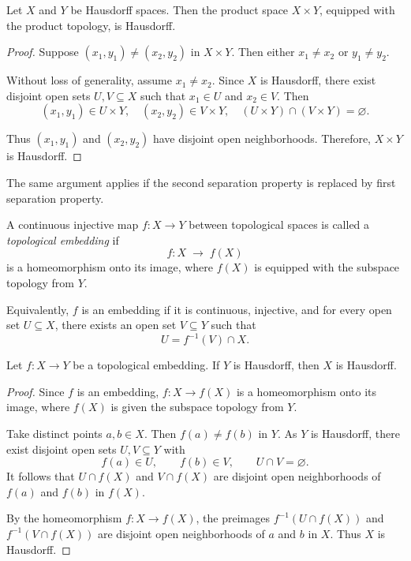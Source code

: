 \begin{proposition} \label{prop:product_Hausdorff}
Let \(X\) and \(Y\) be Hausdorff spaces. Then the product space \(X \times Y\), equipped with the product topology, is Hausdorff.
\end{proposition}

\begin{proof}
Suppose \((x_{1},y_{1}) \neq (x_{2},y_{2})\) in \(X \times Y\). Then either \(x_{1} \neq x_{2}\) or \(y_{1} \neq y_{2}\).

Without loss of generality, assume \(x_{1} \neq x_{2}\). Since \(X\) is Hausdorff, there exist disjoint open sets \(U,V \subseteq X\) such that \(x_{1} \in U\) and \(x_{2} \in V\). Then
\[
(x_{1},y_{1}) \in U \times Y, 
\quad (x_{2},y_{2}) \in V \times Y,
\quad (U \times Y) \cap (V \times Y) = \varnothing.
\]

Thus \((x_{1},y_{1})\) and \((x_{2},y_{2})\) have disjoint open neighborhoods. Therefore, \(X \times Y\) is Hausdorff.
\end{proof}

The same argument applies if the second separation property is replaced by first separation property.

\begin{definition} \label{def:embedding}
A continuous injective map \(f : X \to Y\) between topological spaces is called a \emph{topological embedding} if 
\[
f : X \;\longrightarrow\; f(X)
\]
is a homeomorphism onto its image, where \(f(X)\) is equipped with the subspace topology from \(Y\).
\end{definition}

\begin{remark}
Equivalently, \(f\) is an embedding if it is continuous, injective, and for every open set \(U \subseteq X\), there exists an open set \(V \subseteq Y\) such that 
\[
U = f^{-1}(V) \cap X.
\]
\end{remark}

\begin{proposition} \label{prop:embedding_Hausdorff}
Let \(f : X \to Y\) be a topological embedding. If \(Y\) is Hausdorff, then \(X\) is Hausdorff.
\end{proposition}

\begin{proof}
Since \(f\) is an embedding, \(f : X \to f(X)\) is a homeomorphism onto its image, where \(f(X)\) is given the subspace topology from \(Y\).  

Take distinct points \(a,b \in X\). Then \(f(a) \neq f(b)\) in \(Y\). As \(Y\) is Hausdorff, there exist disjoint open sets \(U,V \subseteq Y\) with 
\[
f(a) \in U, \qquad f(b) \in V, \qquad U \cap V = \varnothing.
\]
It follows that \(U \cap f(X)\) and \(V \cap f(X)\) are disjoint open neighborhoods of \(f(a)\) and \(f(b)\) in \(f(X)\).  

By the homeomorphism \(f : X \to f(X)\), the preimages \(f^{-1}(U \cap f(X))\) and \(f^{-1}(V \cap f(X))\) are disjoint open neighborhoods of \(a\) and \(b\) in \(X\). Thus \(X\) is Hausdorff.
\end{proof}

